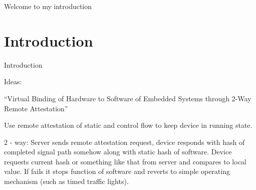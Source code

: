 Welcome to my introduction

\section{Introduction}
Introduction

Ideas:

``Virtual Binding of Hardware to Software of Embedded Systems through 2-Way Remote Attestation''

Use remote attestation of static and control flow to keep device in running state.

2 - way: Server sends remote attestation request, device responds with hash of completed signal path somehow along with static hash of software. Device requests current hash or something like that from server and compares to local value. If fails it stops function of software and reverts to simple operating mechanism (such as timed traffic lights).
